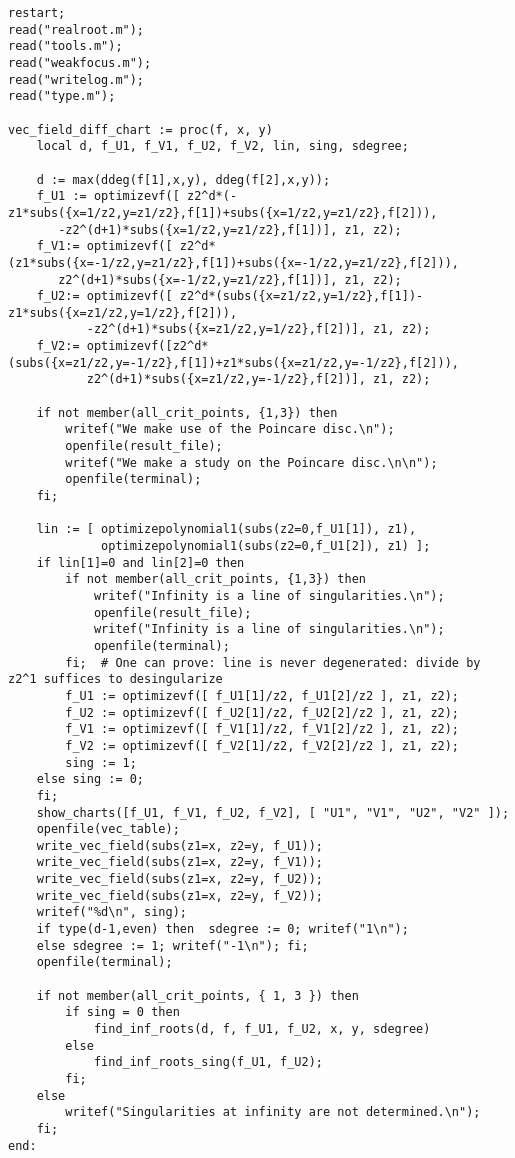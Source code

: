 \documentclass[a4paper,10pt]{article}
\begin{document}
\begin{lstlisting}[name=infinity]
restart;
read("realroot.m");
read("tools.m");
read("weakfocus.m");
read("writelog.m");
read("type.m");

vec_field_diff_chart := proc(f, x, y)
    local d, f_U1, f_V1, f_U2, f_V2, lin, sing, sdegree;

    d := max(ddeg(f[1],x,y), ddeg(f[2],x,y));
    f_U1 := optimizevf([ z2^d*(-z1*subs({x=1/z2,y=z1/z2},f[1])+subs({x=1/z2,y=z1/z2},f[2])),
       -z2^(d+1)*subs({x=1/z2,y=z1/z2},f[1])], z1, z2);
    f_V1:= optimizevf([ z2^d*(z1*subs({x=-1/z2,y=z1/z2},f[1])+subs({x=-1/z2,y=z1/z2},f[2])),
       z2^(d+1)*subs({x=-1/z2,y=z1/z2},f[1])], z1, z2);
    f_U2:= optimizevf([ z2^d*(subs({x=z1/z2,y=1/z2},f[1])-z1*subs({x=z1/z2,y=1/z2},f[2])),
           -z2^(d+1)*subs({x=z1/z2,y=1/z2},f[2])], z1, z2);
    f_V2:= optimizevf([z2^d*(subs({x=z1/z2,y=-1/z2},f[1])+z1*subs({x=z1/z2,y=-1/z2},f[2])),
           z2^(d+1)*subs({x=z1/z2,y=-1/z2},f[2])], z1, z2);

    if not member(all_crit_points, {1,3}) then
        writef("We make use of the Poincare disc.\n");
        openfile(result_file);
        writef("We make a study on the Poincare disc.\n\n");
        openfile(terminal);
    fi;

    lin := [ optimizepolynomial1(subs(z2=0,f_U1[1]), z1),
             optimizepolynomial1(subs(z2=0,f_U1[2]), z1) ];
    if lin[1]=0 and lin[2]=0 then
        if not member(all_crit_points, {1,3}) then
            writef("Infinity is a line of singularities.\n");
            openfile(result_file);
            writef("Infinity is a line of singularities.\n");
            openfile(terminal);
        fi;  # One can prove: line is never degenerated: divide by z2^1 suffices to desingularize
        f_U1 := optimizevf([ f_U1[1]/z2, f_U1[2]/z2 ], z1, z2);
        f_U2 := optimizevf([ f_U2[1]/z2, f_U2[2]/z2 ], z1, z2);
        f_V1 := optimizevf([ f_V1[1]/z2, f_V1[2]/z2 ], z1, z2);
        f_V2 := optimizevf([ f_V2[1]/z2, f_V2[2]/z2 ], z1, z2);
        sing := 1;
    else sing := 0;
    fi;
    show_charts([f_U1, f_V1, f_U2, f_V2], [ "U1", "V1", "U2", "V2" ]);
    openfile(vec_table);
    write_vec_field(subs(z1=x, z2=y, f_U1));
    write_vec_field(subs(z1=x, z2=y, f_V1));
    write_vec_field(subs(z1=x, z2=y, f_U2));
    write_vec_field(subs(z1=x, z2=y, f_V2));
    writef("%d\n", sing);
    if type(d-1,even) then  sdegree := 0; writef("1\n");
    else sdegree := 1; writef("-1\n"); fi;
    openfile(terminal);

    if not member(all_crit_points, { 1, 3 }) then
        if sing = 0 then
            find_inf_roots(d, f, f_U1, f_U2, x, y, sdegree)
        else
            find_inf_roots_sing(f_U1, f_U2);
        fi;
    else
        writef("Singularities at infinity are not determined.\n");
    fi;
end:
\end{lstlisting}
\end{document}
